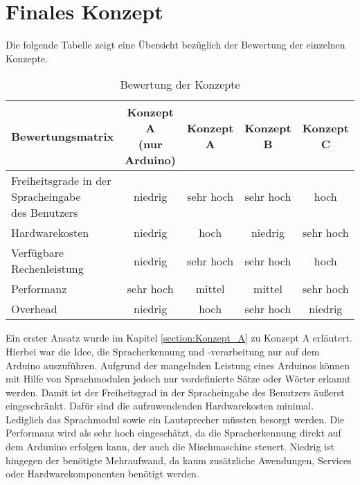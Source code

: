 \section{Finales Konzept}
Die folgende Tabelle zeigt eine Übersicht bezüglich der Bewertung der einzelnen Konzepte.
\begin{table}[H]
    \centering
    \begin{tabular}{l|c|c|c|c}
        Bewertungsmatrix          & \makecell{Konzept A                                     \\ (nur Arduino)} & Konzept A & Konzept B & Konzept C \\
        \hline
        \makecell[l]{Freiheitsgrade in der Spracheingabe                                    \\ des Benutzers} & niedrig                    & sehr hoch & sehr hoch & hoch      \\
        \hline
        Hardwarekosten            & niedrig             & hoch      & niedrig   & sehr hoch \\
        \hline
        Verfügbare Rechenleistung & niedrig             & sehr hoch & sehr hoch & hoch      \\
        \hline
        Performanz                & sehr hoch           & mittel    & mittel    & sehr hoch \\
        \hline
        Overhead                  & niedrig             & hoch      & sehr hoch & niedrig   \\
    \end{tabular}
    \caption{\label{table:Bewertungsmatrix_Konzepte}Bewertung der Konzepte}
\end{table}
\noindent
Ein erster Ansatz wurde im Kapitel \ref{section:Konzept_A} zu Konzept A erläutert.
Hierbei war die Idee, die Spracherkennung und -verarbeitung nur auf dem Arduino auszuführen.
Aufgrund der mangelnden Leistung eines Arduinos können mit Hilfe von Sprachmodulen jedoch nur vordefinierte Sätze oder Wörter erkannt werden.
Damit ist der Freiheitsgrad in der Spracheingabe des Benutzers äußerst eingeschränkt.
Dafür sind die aufzuwendenden Hardwarekosten minimal.
Lediglich das Sprachmodul sowie ein Lautsprecher müssten besorgt werden.
Die Performanz wird als sehr hoch eingeschätzt, da die Spracherkennung direkt auf dem Ardunino erfolgen kann, der auch die Mischmaschine steuert.
Niedrig ist hingegen der benötigte Mehraufwand, da kaum zusätzliche Awendungen, Services oder Hardwarekomponenten benötigt werden.\\\\
